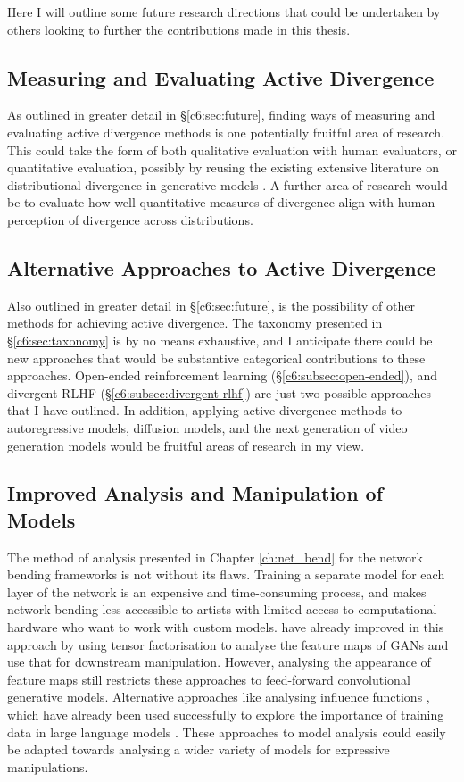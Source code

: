 Here I will outline some future research directions that could be undertaken by others looking to further the contributions made in this thesis.

\subsection{Measuring and Evaluating Active Divergence}
As outlined in greater detail in \S \ref{c6:sec:future}, finding ways of measuring and evaluating active divergence methods is one potentially fruitful area of research.
This could take the form of both qualitative evaluation with human evaluators, or quantitative evaluation, possibly by reusing the existing extensive literature on distributional divergence in generative models \citep{gretton2019interpretable}.
A further area of research would be to evaluate how well quantitative measures of divergence align with human perception of divergence across distributions.

\subsection{Alternative Approaches to Active Divergence}
Also outlined in greater detail in \S \ref{c6:sec:future}, is the possibility of other methods for achieving active divergence. 
The taxonomy presented in \S \ref{c6:sec:taxonomy} is by no means exhaustive, and I anticipate there could be new approaches that would be substantive categorical contributions to these approaches. 
Open-ended reinforcement learning (\S \ref{c6:subsec:open-ended}), and divergent RLHF (\S \ref{c6:subsec:divergent-rlhf}) are just two possible approaches that I have outlined. 
In addition, applying active divergence methods to autoregressive models, diffusion models, and the next generation of video generation models would be fruitful areas of research in my view.

\subsection{Improved Analysis and Manipulation of Models}

The method of analysis presented in Chapter \ref{ch:net_bend} for the network bending frameworks is not without its flaws.
Training a separate model for each layer of the network is an expensive and time-consuming process, and makes network bending less accessible to artists with limited access to computational hardware who want to work with custom models.
\cite{oldfield2022panda,oldfield2024bilinear} have already improved in this approach by using tensor factorisation to analyse the feature maps of GANs and use that for downstream manipulation.
However, analysing the appearance of feature maps still restricts these approaches to feed-forward convolutional generative models.
Alternative approaches like analysing influence functions \citep{koh2017understanding}, which have already been used successfully to explore the importance of training data in large language models \citep{choe2024your}.
These approaches to model analysis could easily be adapted towards analysing a wider variety of models for expressive manipulations.

